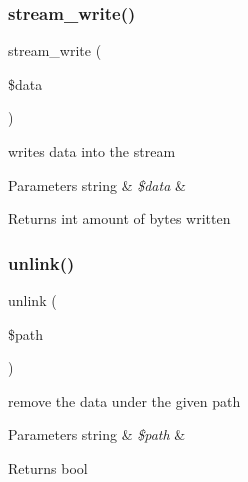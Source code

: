 \subsubsection{\texorpdfstring{stream\+\_\+write()}{stream\_write()}}
{\footnotesize\ttfamily stream\+\_\+write (\begin{DoxyParamCaption}\item[{}]{\$data }\end{DoxyParamCaption})}

writes data into the stream


\begin{DoxyParams}[1]{Parameters}
string & {\em \$data} & \\
\hline
\end{DoxyParams}
\begin{DoxyReturn}{Returns}
int amount of bytes written 
\end{DoxyReturn}
\mbox{\label{classorg_1_1bovigo_1_1vfs_1_1vfs_stream_wrapper_ad6244fc254de2b00ab567e4e0b82a4b3}} 
\subsubsection{\texorpdfstring{unlink()}{unlink()}}
{\footnotesize\ttfamily unlink (\begin{DoxyParamCaption}\item[{}]{\$path }\end{DoxyParamCaption})}

remove the data under the given path


\begin{DoxyParams}[1]{Parameters}
string & {\em \$path} & \\
\hline
\end{DoxyParams}
\begin{DoxyReturn}{Returns}
bool 
\end{DoxyReturn}
\mbox{\label{classorg_1_1bovigo_1_1vfs_1_1vfs_stream_wrapper_abcc2fea2362bdc22b2a1c9387176429c}} 
